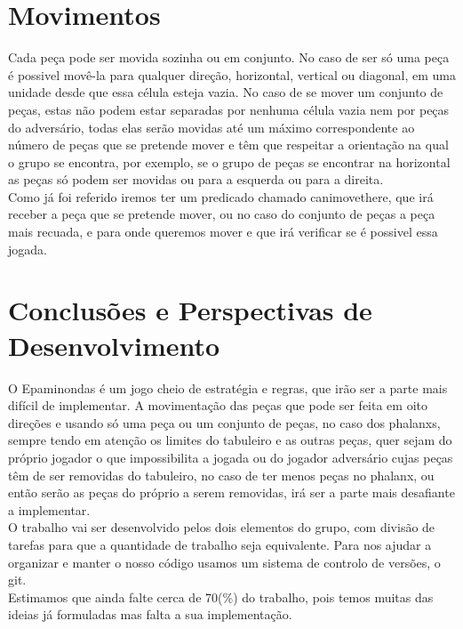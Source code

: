 \documentclass[a4paper]{article}
\begin{document}
\section{Movimentos}
Cada peça pode ser movida sozinha ou em conjunto. No caso de ser só uma peça é possivel movê-la para qualquer direção, horizontal, vertical ou diagonal, em uma unidade desde que essa célula esteja vazia. No caso de se mover um conjunto de peças, estas não podem estar separadas por nenhuma célula vazia nem por peças do adversário, todas elas serão movidas até um máximo correspondente ao número de peças que se pretende mover e têm que respeitar a orientação na qual o grupo se encontra, por exemplo, se o grupo de peças se encontrar na horizontal as peças só podem ser movidas ou para a esquerda ou para a direita.
\\\linebreak
Como já foi referido iremos ter um predicado chamado canimovethere, que irá receber a peça que se pretende mover, ou no caso do conjunto de peças a peça mais recuada, e para onde queremos mover e que irá verificar se é possivel essa jogada.

\section{Conclusões e Perspectivas de Desenvolvimento}
O Epaminondas é um jogo cheio de estratégia e regras, que irão ser a parte mais difícil de implementar. A movimentação das peças que pode ser feita em oito direções e usando só uma peça ou um conjunto de peças, no caso dos phalanxs, sempre tendo em atenção os limites do tabuleiro e as outras peças, quer sejam do próprio jogador o que impossibilita a jogada ou do jogador adversário cujas peças têm de ser removidas do tabuleiro, no caso de ter menos peças no phalanx, ou então serão as peças do próprio a serem removidas, irá ser a parte mais desafiante a implementar.
\\\linebreak
O trabalho vai ser desenvolvido pelos dois elementos do grupo, com divisão de tarefas para que a quantidade de trabalho seja equivalente. Para nos ajudar a organizar e manter o nosso código usamos um sistema de controlo de versões, o git.
\\\linebreak
Estimamos que ainda falte cerca de 70(\%) do trabalho, pois temos muitas das ideias já formuladas mas falta a sua implementação.

\clearpage
{}
\renewcommand\refname{Bibliografia}


\end{document}
